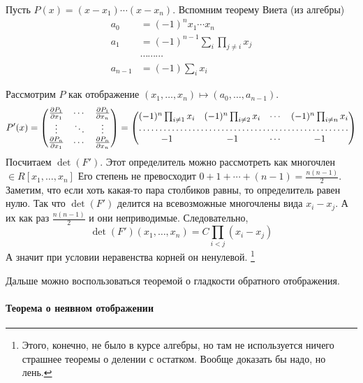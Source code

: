 \documentclass[12pt,timbord]{../../../notes}
\begin{document}
\begin{ittproof}
  Пусть $P(x) = (x - x_1) \dotsm (x - x_n)$. Вспомним теорему Виета (из алгебры)
  \begin{align*}
    a_0     & = (-1)^n x_1 \dotsm x_n \\
    a_1     & = (-1)^{n-1} \sum_{i} \prod_{j \neq i} x_j \\
            & \cdots \cdots \cdots  \\
    a_{n-1} & = (-1) \sum_i x_i
  \end{align*}

  Рассмотрим $P$ как отображение $(x_1, \dotsc, x_n) \mapsto (a_0, \dotsc, a_{n-1})$.
  \[
    P'(x) = 
    \begin{pmatrix}
      \frac{\partial P_1}{\partial x_1} & \cdots & \frac{\partial P_1}{\partial x_n} \\
      \vdots & \ddots & \vdots \\
      \frac{\partial P_n}{\partial x_1} & \cdots & \frac{\partial P_n}{\partial x_n} \\
    \end{pmatrix}
    = 
    \begin{pmatrix}
      (-1)^n \prod_{i\neq 1} x_i & (-1)^n \prod_{i\neq 2} x_i & \cdots & (-1)^n \prod_{i\neq n} x_i \\
      \hdotsfor{4} \\
      -1 & -1 & \cdots & -1 
    \end{pmatrix}
  \]
  Посчитаем $\det(F')$. Этот определитель можно рассмотреть как многочлен $\in R[x_1, \dotsc, x_n]$
  Его степень не превосходит $0 + 1 + \dotsb + (n-1) = \frac{n(n-1)}{2}$. Заметим, что если хоть
  какая-то пара столбиков равны, то определитель равен нулю. Так что $\det(F')$ делится на
  всевозможные многочлены вида $x_i - x_j$. А их как раз $\frac{n(n-1)}{2}$ и они неприводимые.
  Следовательно, 
  \[
    \det (F')(x_1, \dotsc, x_n) = C \prod_{i<j} (x_i - x_j) 
  \]
  А значит при условии неравенства корней он ненулевой.
  \footnote{Этого, конечно, не было в курсе алгебры, но там не используется ничего страшнее
  теоремы о делении с остатком. Вообще доказать бы надо, но лень.}

  Дальше можно воспользоваться теоремой о гладкости обратного отображения.
\end{ittproof}

\paragraph{Теорема о неявном отображении}
\label{par:diffspace::implicit}
\end{document}
